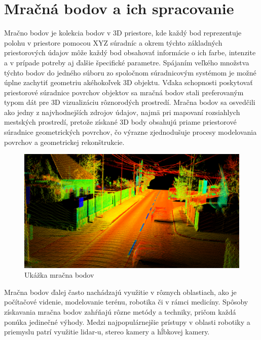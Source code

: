 \section{Mračná bodov a ich spracovanie}
\noindent Mračno bodov je kolekcia bodov v 3D priestore, kde každý bod reprezentuje polohu v priestore pomocou XYZ súradníc a okrem týchto základných priestorových údajov môže každý bod obsahovať informácie o ich farbe, intenzite a v prípade potreby aj ďalšie špecifické parametre. Spájaním veľkého množstva týchto bodov do jedného súboru zo spoločnom súradnicovým systémom je možné úplne zachytiť geometriu akéhokoľvek 3D objektu. Vďaka schopnosti poskytovať priestorové súradnice povrchov objektov sa mračná bodov stali preferovaným typom dát pre 3D vizualizáciu rôznorodých prostredí. Mračna bodov sa osvedčili ako jedny z najvhodnejších zdrojov údajov, najmä pri mapovaní rozsiahlych mestských prostredí, pretože získané 3D body obsahujú priame priestorové súradnice geometrických povrchov, čo výrazne zjednodušuje procesy modelovania povrchov a geometrickej rekonštrukcie. \cite{voxel_grid} 
\newline\begin{figure}[!htbp]
  \centering
  \includegraphics[width=16cm]{img/ukazka_pc.png}
  \caption{Ukážka mračna bodov}
  \label{vzhladobr}
\end{figure}	
\newline\indent Mračna bodov ďalej často nachádzajú využitie v rôznych oblastiach, ako je počítačové videnie, modelovanie terénu, robotika či v rámci medicíny. Spôsoby získavania mračna bodov zahŕňajú rôzne metódy a techniky, pričom každá ponúka jedinečné výhody. Medzi najpopulárnejšie prístupy v oblasti robotiky a priemyslu patrí využitie \acrshort{lidar}-u, stereo kamery a hĺbkovej kamery.


